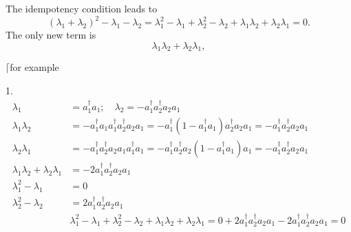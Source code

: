 \documentclass[aps,preprint]{revtex4}%
\begin{document}
The idempotency condition leads to%
\begin{equation}
\left(  \lambda_{1}+\lambda_{2}\right)  ^{2}-\lambda_{1}-\lambda_{2}%
=\lambda_{1}^{2}-\lambda_{1}+\lambda_{2}^{2}-\lambda_{2}+\lambda_{1}%
\lambda_{2}+\lambda_{2}\lambda_{1}=0.
\end{equation}
The only new term is
\begin{equation}
\lambda_{1}\lambda_{2}+\lambda_{2}\lambda_{1},
\end{equation}


$\lceil$for example

1.
\begin{align}
\lambda_{1}  &  =a_{1}^{\dagger}a_{1};\quad\lambda_{2}=-a_{1}^{\dagger}%
a_{2}^{\dagger}a_{2}a_{1}\nonumber\\
\lambda_{1}\lambda_{2}  &  =-a_{1}^{\dagger}a_{1}a_{1}^{\dagger}a_{2}%
^{\dagger}a_{2}a_{1}=-a_{1}^{\dagger}\left(  1-a_{1}^{\dagger}a_{1}\right)
a_{2}^{\dagger}a_{2}a_{1}=-a_{1}^{\dagger}a_{2}^{\dagger}a_{2}a_{1}\nonumber\\
\lambda_{2}\lambda_{1}  &  =-a_{1}^{\dagger}a_{2}^{\dagger}a_{2}a_{1}%
a_{1}^{\dagger}a_{1}=-a_{1}^{\dagger}a_{2}^{\dagger}a_{2}\left(
1-a_{1}^{\dagger}a_{1}\right)  a_{1}=-a_{1}^{\dagger}a_{2}^{\dagger}a_{2}%
a_{1}\nonumber\\
\lambda_{1}\lambda_{2}+\lambda_{2}\lambda_{1}  &  =-2a_{1}^{\dagger}%
a_{2}^{\dagger}a_{2}a_{1}\nonumber\\
\lambda_{1}^{2}-\lambda_{1}  &  =0\nonumber\\
\lambda_{2}^{2}-\lambda_{2}  &  =2a_{1}^{\dagger}a_{2}^{\dagger}a_{2}%
a_{1}\nonumber\\
&  \lambda_{1}^{2}-\lambda_{1}+\lambda_{2}^{2}-\lambda_{2}+\lambda_{1}%
\lambda_{2}+\lambda_{2}\lambda_{1}=0+2a_{1}^{\dagger}a_{2}^{\dagger}a_{2}%
a_{1}-2a_{1}^{\dagger}a_{2}^{\dagger}a_{2}a_{1}=0
\end{align}
\end{document}
